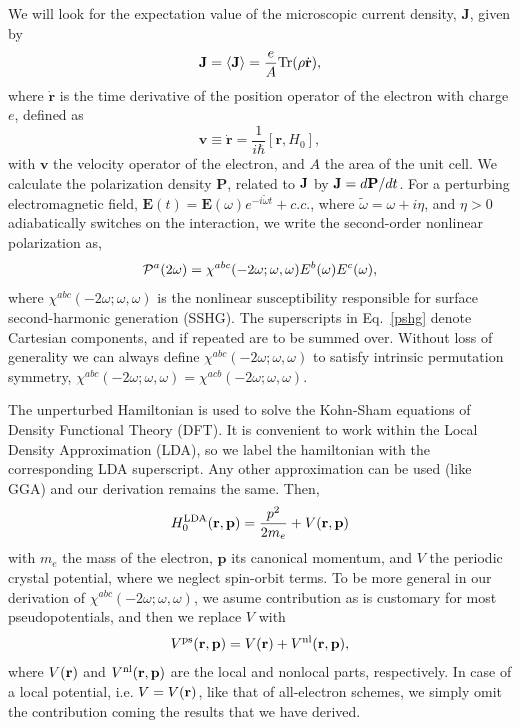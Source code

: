 \documentclass[floatfix,prb,aps,superscriptaddress,11pt,preprint,letterpaper]{revtex4}
\begin{document}
We will look for the expectation value of the microscopic current density, 
$\mathbf{J}$, given by 
\begin{equation}
\mathbf{J}=\langle{\mathbf{J}}\rangle=\frac{e}{A}\mbox{Tr}({\rho}\dot{\mathbf{r}})
,
\label{pe}
\end{equation}
where $\dot{\mathbf{r}}$ is the time derivative of the position operator of the
electron with charge $e$, defined as
\begin{equation}
\mathbf{v}\equiv \dot{\mathbf{r}}=\frac{1}{i\hbar }[\mathbf{r},H_0],  
\label{mv}
\end{equation}
with $\mathbf{v}$ the velocity operator of the electron, and $A$ the
area of the unit cell. We calculate the polarization density 
$\mathbf{P}$, related to $\mathbf{J}$ by
$\mathbf{J}=d\mathbf{P}/dt$. For a 
perturbing electromagnetic field, $\mathbf{E}(t)=
\mathbf{E}(\omega )e^{-i\tilde{\omega} t}+c.c.$,
where $\tilde\omega=\omega+i\eta $,
and $\eta >0$ adiabatically switches on the interaction,
we write the second-order nonlinear
polarization as, 
\begin{equation}
{\mathbf{\cal P}}^a(2\omega)=\chi ^{abc}(-2\omega;\omega,\omega)E^{b}(\omega)E^{c}(\omega),  
\label{pshg}
\end{equation}
where $\chi^{abc}(-2\omega ;\omega ,\omega )$ is the nonlinear
susceptibility responsible for surface second-harmonic generation
(SSHG). 
The 
superscripts in Eq.~\eqref{pshg} denote Cartesian components, and if
repeated are to be summed over. Without loss of generality we can always
define $\chi^{abc}(-2\omega;\omega,\omega)$
 to satisfy intrinsic permutation
symmetry, 
$\chi^{abc}(-2\omega ;\omega ,\omega )=\chi ^{acb}(-2\omega ;\omega
,\omega )$.

The unperturbed Hamiltonian 
is used to solve the Kohn-Sham equations\cite{kohnPR65} of Density  
Functional Theory (DFT). It is convenient to work within the Local 
Density Approximation (LDA), so we label the hamiltonian with the corresponding  
LDA superscript. Any other approximation can be used (like GGA) and our 
derivation remains the same. Then,
\begin{equation}\label{h0}
H^{\mathrm{LDA}}_{0}(\mathbf{r},\mathbf{p})
=\frac{p^{2}}{2m_e}+V(\mathbf{r},\mathbf{p})
\end{equation}
with $m_e$ the mass of the electron, $\mathbf{p}$ its canonical momentum, and 
$V$
 the periodic crystal potential, where we neglect spin-orbit terms.
To be more general in our derivation of
$\chi^{abc}(-2\omega;\omega,\omega)$, we asume
contribution as is customary for most
pseudopotentials, and then we replace $V$ with
\begin{align}\label{ps}
V^{\mathrm{ps}}(\mathbf{r},\mathbf{p})=V(\mathbf{r})+V^{\mathrm{nl}}(\mathbf{r},\mathbf{p})
,
\end{align}
where 
$V(\mathbf{r})$ and $V^{\mathrm{nl}}(\mathbf{r},\mathbf{p})$  are the local and nonlocal parts, 
 respectively.
In case of
a local potential, i.e. $V= V(\mathbf{r})$, 
like that of all-electron schemes, 
we simply omit the contribution coming
the results that we have derived.
\end{document}
